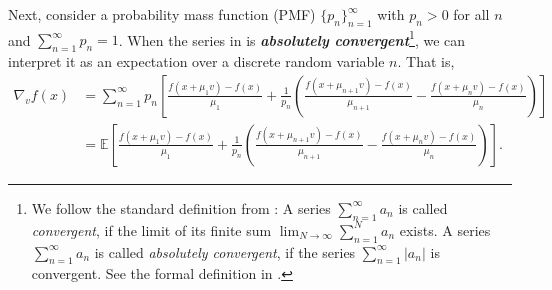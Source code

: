 \documentclass{article}
\theoremstyle{definition}
\theoremstyle{plain}
\theoremstyle{remark}
\begin{document}
Next, consider a probability mass function (PMF) \(\{p_n\}_{n=1}^\infty\) with \(p_n > 0\) for all \(n\) and \(\sum_{n=1}^\infty p_n = 1\). When the series in  is \textbf{\textit{absolutely convergent}}\footnote{We follow the standard definition from \citet{spivak2008calculus}: A series $\sum_{n=1}^\infty a_n$ is called \textit{convergent}, if the limit of its finite sum $\lim_{N\to \infty }\sum_{n=1}^N a_n$ exists. A series $\sum_{n=1}^\infty a_n$ is called \textit{absolutely convergent}, if the series $\sum_{n=1}^\infty |a_n|$ is convergent. See the formal definition in .}, we can interpret it as an expectation over a discrete random variable $n$. That is, 
\begin{align}
\nabla_v f(x) &= \sum_{n=1}^\infty p_n\left[\frac{f(x+\mu_1 v) - f(x)}{\mu_1} + \frac{1}{p_n}\left( \frac{f(x+\mu_{n+1} v) - f(x)}{\mu_{n+1}} - \frac{f(x+\mu_n v) - f(x)}{\mu_n}\right) \right] \nonumber\\
&= \mathbb{E}\left[\frac{f(x+\mu_1 v) - f(x)}{\mu_1} + \frac{1}{p_n}\left( \frac{f(x+\mu_{n+1} v) - f(x)}{\mu_{n+1}} - \frac{f(x+\mu_n v) - f(x)}{\mu_n}\right) \right]. \label{eq:expectation}
\end{align}
\end{document}
